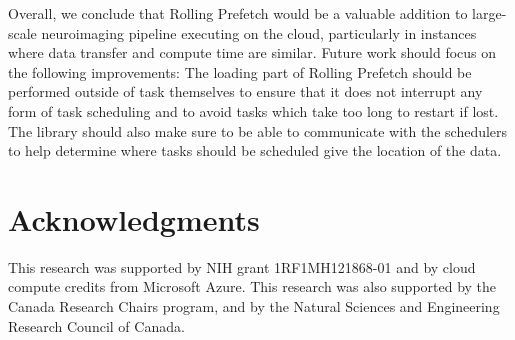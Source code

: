 \documentclass[conference]{IEEEtran}
\begin{document}

Overall, we conclude that Rolling Prefetch would be a valuable addition to large-scale neuroimaging pipeline executing
on the cloud, particularly in instances where data transfer and compute time are similar. 
Future work should focus on the following improvements: The loading part of Rolling Prefetch should be performed outside of task themselves to ensure that it does not interrupt any form of task scheduling and to avoid tasks which take too long to restart if lost. 
The library should also make sure to be able to communicate with the schedulers to help determine where tasks
should be scheduled give the location of the data.

\section{Acknowledgments} 

This research was supported by NIH grant 1RF1MH121868-01 and by cloud compute credits from Microsoft Azure. This research was also supported by the Canada Research Chairs program, and by the Natural Sciences and Engineering Research Council of Canada.




\end{document}
